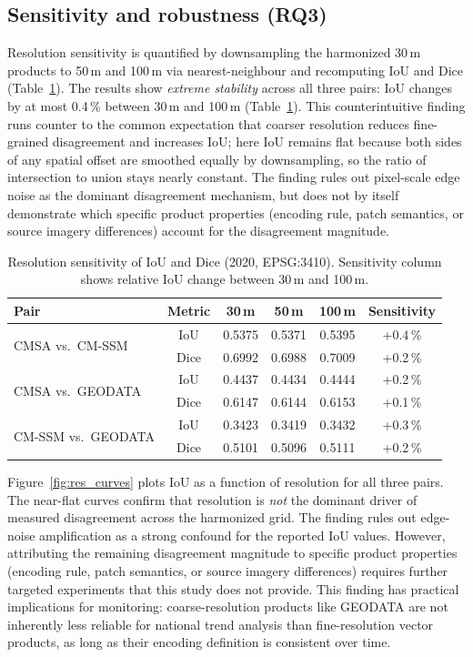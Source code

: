 \documentclass[11pt]{article}
\begin{document}
\subsection{Sensitivity and robustness (RQ3)}
\label{sec:robustness-results}

Resolution sensitivity is quantified by downsampling the harmonized 30\,m
products to 50\,m and 100\,m via nearest-neighbour and recomputing IoU and
Dice (Table~\ref{tab:sens}). The results show \emph{extreme stability} across
all three pairs: IoU changes by at most 0.4\,\% between 30\,m and 100\,m
(Table~\ref{tab:sens}). This counterintuitive finding runs counter to the
common expectation that coarser resolution reduces fine-grained disagreement
and increases IoU; here IoU remains flat because both sides of any spatial
offset are smoothed equally by downsampling, so the ratio of intersection to
union stays nearly constant. The finding rules out pixel-scale edge noise as
the dominant disagreement mechanism, but does not by itself demonstrate which
specific product properties (encoding rule, patch semantics, or source imagery
differences) account for the disagreement magnitude.

\begin{table}[htpb]
\centering
\caption{\label{tab:sens}Resolution sensitivity of IoU and Dice (2020, EPSG:3410).
  Sensitivity column shows relative IoU change between 30\,m and 100\,m.}
\begin{tabular}{l c c c c c}
\toprule
Pair & Metric & 30\,m & 50\,m & 100\,m & Sensitivity \\
\midrule
\multirow{2}{*}{CMSA vs.\ CM-SSM}
  & IoU  & 0.5375 & 0.5371 & 0.5395 & +0.4\,\% \\
  & Dice & 0.6992 & 0.6988 & 0.7009 & +0.2\,\% \\
\multirow{2}{*}{CMSA vs.\ GEODATA}
  & IoU  & 0.4437 & 0.4434 & 0.4444 & +0.2\,\% \\
  & Dice & 0.6147 & 0.6144 & 0.6153 & +0.1\,\% \\
\multirow{2}{*}{CM-SSM vs.\ GEODATA}
  & IoU  & 0.3423 & 0.3419 & 0.3432 & +0.3\,\% \\
  & Dice & 0.5101 & 0.5096 & 0.5111 & +0.2\,\% \\
\bottomrule
\end{tabular}
\end{table}

Figure~\ref{fig:res_curves} plots IoU as a function of resolution for all
three pairs. The near-flat curves confirm that resolution is \emph{not} the
dominant driver of measured disagreement across the harmonized grid. The
finding rules out edge-noise amplification as a strong confound for the
reported IoU values. However, attributing the remaining disagreement
magnitude to specific product properties (encoding rule, patch semantics,
or source imagery differences) requires further targeted experiments that
this study does not provide. This finding has practical
implications for monitoring: coarse-resolution products like GEODATA are not
inherently less reliable for national trend analysis than fine-resolution
vector products, as long as their encoding definition is consistent over time.
\end{document}
